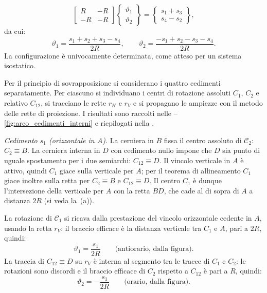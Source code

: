	\begin{equation*}
		\begin{bmatrix}
			R & -R \\
			-R & -R
		\end{bmatrix}
		\begin{Bmatrix}
			\vartheta_1 \\ \vartheta_2
		\end{Bmatrix}
		=
		\begin{Bmatrix}
			s_1 + s_3 \\ s_4 - s_2
		\end{Bmatrix},
	\end{equation*}
	da cui:
	\begin{equation*}\label{eq:arco_rotazioni}
		\vartheta_1 = \frac{s_1 + s_2 + s_3 - s_4}{2R},
		\qquad
		\vartheta_2 = \frac{-s_1 + s_2 - s_3 - s_4}{2R}.
	\end{equation*}
	La configurazione è univocamente determinata, come atteso
	per un sistema isostatico.
	
	\noindent	{}
	Per il principio di sovrapposizione si considerano i	quattro cedimenti separatamente. Per ciascuno si individuano i centri di rotazione assoluti $C_1$, $C_2$	e relativo $C_{12}$, si tracciano le rette $r_H$ e $r_V$ e si propagano le ampiezze con il metodo delle rette di	proiezione. I risultati sono raccolti nelle	--\ref{fig:arco_cedimenti_interni} e	riepilogati nella	.
	
	



	
	\smallskip
	\noindent\textit{Cedimento $s_1$ (orizzontale in $A$).}
	La cerniera in $B$ fissa il centro assoluto di
	$\mathcal{C}_2$: $C_2 \equiv B$. La cerniera interna in
	$D$ con cedimento nullo impone che $D$ sia punto di uguale
	spostamento per i due semiarchi: $C_{12} \equiv D$.
	Il vincolo verticale in $A$ è attivo, quindi $C_1$ giace
	sulla verticale per $A$; per il teorema di allineamento
	$C_1$ giace inoltre sulla retta per $C_2 \equiv B$ e
	$C_{12} \equiv D$. Il centro $C_1$ è dunque
	l'intersezione della verticale per $A$ con la retta
	$BD$, che cade al di sopra di $A$ a distanza $2R$
	(si veda la \,(a)). 	
	
	La rotazione di $\mathcal{C}_1$ si ricava dalla
	prestazione del vincolo orizzontale cedente in $A$,
	usando la retta $r_V$: il braccio efficace è la distanza
	verticale tra $C_1$ e $A$, pari a $2R$, quindi:
	\begin{equation*}
		\vartheta_1 = \frac{s_1}{2R} \qquad
		\text{(antiorario, dalla figura)}.
	\end{equation*}
	La traccia di $C_{12} \equiv D$ su $r_V$ è interna al
	segmento tra le tracce di $C_1$ e $C_2$: le rotazioni
	sono discordi e il braccio efficace di $C_2$ rispetto
	a $C_{12}$ è pari a $R$, quindi:
	\begin{equation*}
		\vartheta_2 = -\frac{s_1}{2R} \qquad
		\text{(orario, dalla figura)}.
	\end{equation*}
	
